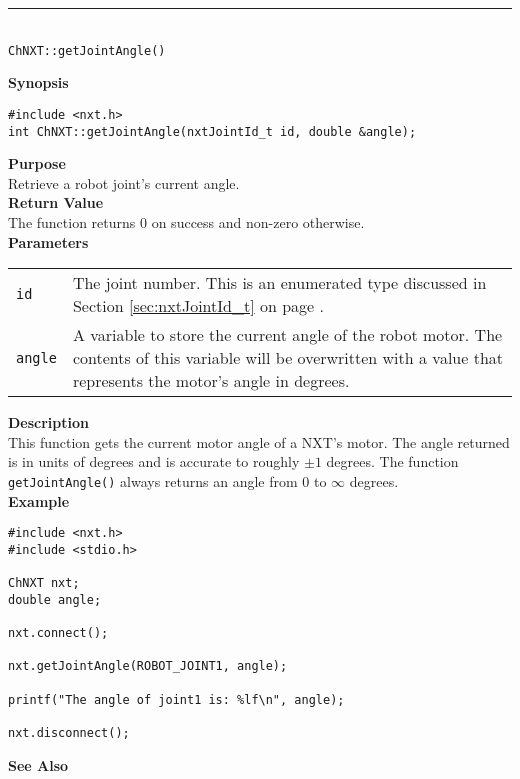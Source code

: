 \noindent
\vspace{5pt}
\rule{4.5in}{0.015in}\\
\noindent
{\LARGE \texttt{ChNXT::getJointAngle()}}\\
{}

\noindent
{\bf Synopsis}
\vspace{-8pt}
\begin{verbatim}
#include <nxt.h>
int ChNXT::getJointAngle(nxtJointId_t id, double &angle);
\end{verbatim}

\noindent
{\bf Purpose}\\
Retrieve a robot joint's current angle.\\

\noindent
{\bf Return Value}\\
The function returns 0 on success and non-zero otherwise.\\

\noindent
{\bf Parameters}\\
\vspace{-0.1in}
\begin{description}
\item               
\begin{tabular}{p{15 mm}p{145 mm}}
\texttt{id} & The joint number. This is an enumerated type 
discussed in Section \ref{sec:nxtJointId_t} on page
\pageref{sec:nxtJointId_t}.\\
\texttt{angle} & A variable to store the current angle of the robot
motor. The contents of this variable will be overwritten with a value that
represents the motor's angle in degrees.  \\
\end{tabular}
\end{description}

\noindent
{\bf Description}\\
This function gets the current motor angle of a NXT's motor. The
angle returned is in units of degrees and is accurate to roughly $\pm1$
degrees. The function \texttt{getJointAngle()} always returns an angle 
from 0 to $\infty$ degrees.\\

\noindent
{\bf Example}\\
\begin{verbatim}
#include <nxt.h>
#include <stdio.h>

ChNXT nxt;
double angle;

nxt.connect();

nxt.getJointAngle(ROBOT_JOINT1, angle);

printf("The angle of joint1 is: %lf\n", angle);

nxt.disconnect();
\end{verbatim}

\noindent
{\bf See Also}\\

